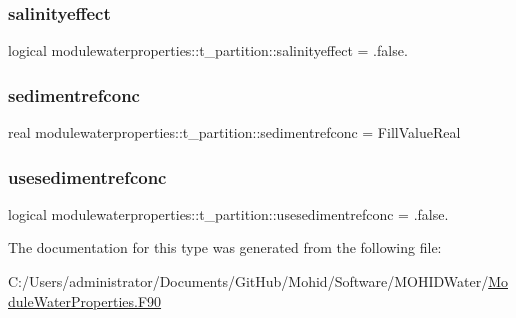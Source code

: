 \subsubsection{\texorpdfstring{salinityeffect}{salinityeffect}}
{\footnotesize\ttfamily logical modulewaterproperties\+::t\+\_\+partition\+::salinityeffect = .false.\hspace{0.3cm}{\ttfamily [private]}}

\mbox{\label{structmodulewaterproperties_1_1t__partition_a6ecbe7e5b323da75ada49a78f2d4cec2}} 
\subsubsection{\texorpdfstring{sedimentrefconc}{sedimentrefconc}}
{\footnotesize\ttfamily real modulewaterproperties\+::t\+\_\+partition\+::sedimentrefconc = Fill\+Value\+Real\hspace{0.3cm}{\ttfamily [private]}}

\mbox{\label{structmodulewaterproperties_1_1t__partition_a8a58c54836f117557529cfa0343bf02e}} 
\subsubsection{\texorpdfstring{usesedimentrefconc}{usesedimentrefconc}}
{\footnotesize\ttfamily logical modulewaterproperties\+::t\+\_\+partition\+::usesedimentrefconc = .false.\hspace{0.3cm}{\ttfamily [private]}}



The documentation for this type was generated from the following file\+:\begin{DoxyCompactItemize}
\item 
C\+:/\+Users/administrator/\+Documents/\+Git\+Hub/\+Mohid/\+Software/\+M\+O\+H\+I\+D\+Water/\mbox{\hyperlink{_module_water_properties_8_f90}{Module\+Water\+Properties.\+F90}}\end{DoxyCompactItemize}
